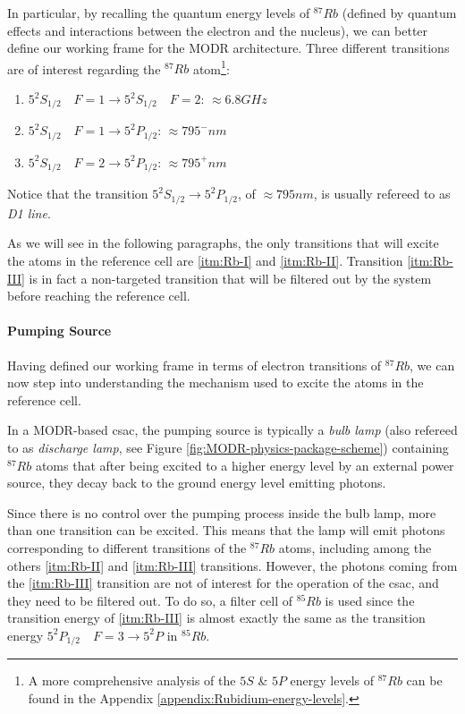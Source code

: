 In particular, by recalling the quantum energy levels of $^{87}Rb$ (defined by quantum effects and interactions between the electron and the nucleus), we can better define our working frame for the MODR architecture.
Three different transitions are of interest regarding the $^{87}Rb$ atom\footnote{A more comprehensive analysis of the $5S$ \& $5P$ energy levels of $^{87}Rb$ can be found in the Appendix \ref{appendix:Rubidium-energy-levels}.}:

\begin{enumerate}[label = Rb.\Roman*, ref = Rb.\Roman*, leftmargin = *]
    \item \label{itm:Rb-I} $5^2S_{1/2} \quad F=1 \rightarrow 5^2S_{1/2} \quad F=2$: $\approx 6.8GHz$
    \item \label{itm:Rb-II} $5^2S_{1/2} \quad F=1 \rightarrow 5^2P_{1/2}$: $\approx 795^{-}nm$
    \item \label{itm:Rb-III} $5^2S_{1/2} \quad F=2 \rightarrow 5^2P_{1/2}$: $\approx 795^{+}nm$
\end{enumerate}

Notice that the transition $5^2S_{1/2} \rightarrow 5^2P_{1/2}$, of $\approx 795nm$, is usually refereed to as \textit{D1 line}.

As we will see in the following paragraphs, the only transitions that will excite the atoms in the reference cell are \ref{itm:Rb-I} and \ref{itm:Rb-II}.
Transition \ref{itm:Rb-III} is in fact a non-targeted transition that will be filtered out by the system before reaching the reference cell.


\paragraph{Pumping Source}

Having defined our working frame in terms of electron transitions of $^{87}Rb$, we can now step into understanding the mechanism used to excite the atoms in the reference cell.

In a MODR-based \acrshort{csac}, the pumping source is typically a \textit{bulb lamp} (also refereed to as \textit{discharge lamp}, see Figure \ref{fig:MODR-physics-package-scheme}) containing $^{87}Rb$ atoms that after being excited to a higher energy level by an external power source, they decay back to the ground energy level emitting photons.

Since there is no control over the pumping process inside the bulb lamp, more than one transition can be excited.
This means that the lamp will emit photons corresponding to different transitions of the $^{87}Rb$ atoms, including among the others \ref{itm:Rb-II} and \ref{itm:Rb-III} transitions.
However, the photons coming from the \ref{itm:Rb-III} transition are not of interest for the operation of the \acrshort{csac}, and they need to be filtered out.
To do so, a filter cell of $^{85}Rb$ is used since the transition energy of \ref{itm:Rb-III} is almost exactly the same as the transition energy $5^2P_{1/2} \quad F=3 \rightarrow 5^2P$ in $^{85}Rb$.


